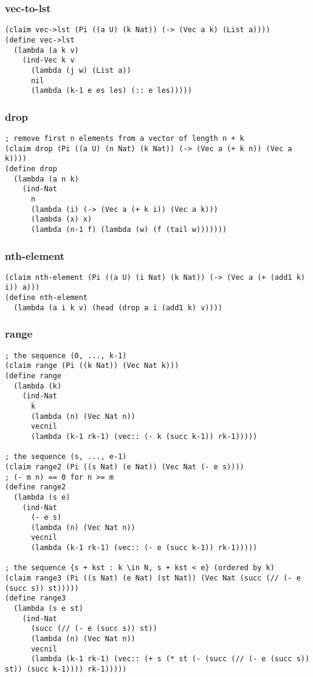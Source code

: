 \subsubsection{vec-to-lst} \label{code:vec-to-lst}
\begin{verbatim}
(claim vec->lst (Pi ((a U) (k Nat)) (-> (Vec a k) (List a))))
(define vec->lst
  (lambda (a k v)
    (ind-Vec k v
      (lambda (j w) (List a))
      nil
      (lambda (k-1 e es les) (:: e les)))))
\end{verbatim}

\subsubsection{drop} \label{code:drop}
\begin{verbatim}
; remove first n elements from a vector of length n + k
(claim drop (Pi ((a U) (n Nat) (k Nat)) (-> (Vec a (+ k n)) (Vec a k))))
(define drop
  (lambda (a n k)
    (ind-Nat
      n
      (lambda (i) (-> (Vec a (+ k i)) (Vec a k)))
      (lambda (x) x)
      (lambda (n-1 f) (lambda (w) (f (tail w)))))))
\end{verbatim}

\subsubsection{nth-element} \label{code:nth-element}
\begin{verbatim}
(claim nth-element (Pi ((a U) (i Nat) (k Nat)) (-> (Vec a (+ (add1 k) i)) a)))
(define nth-element
  (lambda (a i k v) (head (drop a i (add1 k) v))))
\end{verbatim}

\subsubsection{range} \label{code:range}
\begin{verbatim}
; the sequence (0, ..., k-1)
(claim range (Pi ((k Nat)) (Vec Nat k)))
(define range
  (lambda (k)
    (ind-Nat
      k
      (lambda (n) (Vec Nat n))
      vecnil
      (lambda (k-1 rk-1) (vec:: (- k (succ k-1)) rk-1)))))

; the sequence (s, ..., e-1)
(claim range2 (Pi ((s Nat) (e Nat)) (Vec Nat (- e s))))
; (- m n) == 0 for n >= m
(define range2
  (lambda (s e)
    (ind-Nat
      (- e s)
      (lambda (n) (Vec Nat n))
      vecnil
      (lambda (k-1 rk-1) (vec:: (- e (succ k-1)) rk-1)))))

; the sequence {s + kst : k \in N, s + kst < e} (ordered by k)
(claim range3 (Pi ((s Nat) (e Nat) (st Nat)) (Vec Nat (succ (// (- e (succ s)) st)))))
(define range3
  (lambda (s e st)
    (ind-Nat
      (succ (// (- e (succ s)) st))
      (lambda (n) (Vec Nat n))
      vecnil
      (lambda (k-1 rk-1) (vec:: (+ s (* st (- (succ (// (- e (succ s)) st)) (succ k-1)))) rk-1)))))
\end{verbatim}

